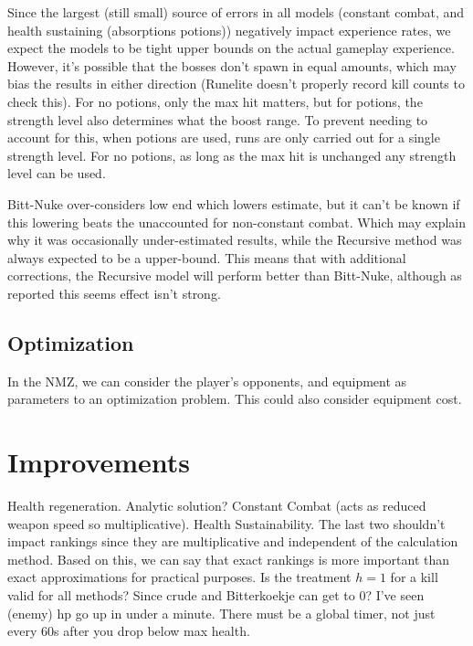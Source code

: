 \documentclass[../../main.tex]{subfiles}
\begin{document}
			Since the largest (still small) source of errors in all models (constant combat, and health sustaining (absorptions potions)) negatively impact experience rates, we expect the models to be tight upper bounds on the actual gameplay experience. However, it's possible that the bosses don't spawn in equal amounts, which may bias the results in either direction (Runelite doesn't properly record kill counts to check this). For no potions, only the max hit matters, but for potions, the strength level also determines what the boost range. To prevent needing to account for this, when potions are used, runs are only carried out for a single strength level. For no potions, as long as the max hit is unchanged any strength level can be used.

			Bitt-Nuke over-considers low end which lowers estimate, but it can't be known if this lowering beats the unaccounted for non-constant combat. Which may explain why it was occasionally under-estimated results, while the Recursive method was always expected to be a upper-bound. This means that with additional corrections, the Recursive model will perform better than Bitt-Nuke, although as reported this seems effect isn't strong.

		\subsection{Optimization}
			In the NMZ, we can consider the player's opponents, and equipment as parameters to an optimization problem. This could also consider equipment cost. 

	\section{Improvements}
		Health regeneration. Analytic solution? Constant Combat (acts as reduced weapon speed so multiplicative). Health Sustainability. The last two shouldn't impact rankings since they are multiplicative and independent of the calculation method. Based on this, we can say that exact rankings is more important than exact approximations for practical purposes. Is the treatment $h=1$ for a kill valid for all methods? Since crude and Bitterkoekje can get to 0? I've seen (enemy) hp go up in under a minute. There must be a global timer, not just every 60s after you drop below max health.
\end{document}
